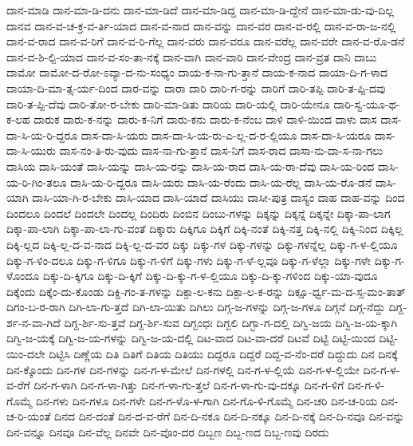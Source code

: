 {ದಾನ-ಮಾಡಿ
ದಾನ-ಮಾ-ಡಿ-ದನು
ದಾನ-ಮಾ-ಡಿದೆ
ದಾನ-ಮಾ-ಡಿದ್ದ
ದಾನ-ಮಾ-ಡಿ-ದ್ದೇನೆ
ದಾನ-ಮಾ-ಡು-ವು-ದಿಲ್ಲ
ದಾನವ
ದಾನ-ವ-ಚ-ಕ್ರ-ವ-ರ್ತಿ-ಯಾದ
ದಾನ-ವ-ನಾದ
ದಾನ-ವನ್ನು
ದಾನ-ವರ
ದಾನ-ವ-ರಲ್ಲಿ
ದಾನ-ವ-ರಾ-ಜ-ನಲ್ಲಿ
ದಾನ-ವ-ರಾದ
ದಾನ-ವ-ರಿಗೆ
ದಾನ-ವ-ರಿ-ಗೆಲ್ಲ
ದಾನ-ವರು
ದಾನ-ವರೂ
ದಾನ-ವರೆಲ್ಲ
ದಾನ-ವರೇ
ದಾನ-ವ-ರೊ-ಡನೆ
ದಾನ-ವ-ಶಿ-ಲ್ಪಿ-ಯಾದ
ದಾನ-ವ-ಸಂ-ತಾ-ನಕ್ಕೆ
ದಾನ-ವಾಗಿ
ದಾನ-ವಾರಿ
ದಾನ-ವೇಂದ್ರ
ದಾನ-ವ್ರತ
ದಾನಿ
ದಾಬು
ದಾಮೋ
ದಾಮೋ-ದ-ರೋ-ಽವ್ಯಾ-ದ-ನು-ಸಂಧ್ಯಂ
ದಾಯ-ಕ-ನಾ-ಗು-ತ್ತಾನೆ
ದಾಯ-ಕ-ನಾದ
ದಾಯಾ-ದಿ-ಗ-ಳಾದ
ದಾಯಾ-ದಿ-ಮಾ-ತ್ಸ-ರ್ಯ-ದಿಂದ
ದಾರ-ವನ್ನು
ದಾರಾ
ದಾರಿ
ದಾರಿ-ಗ-ರನ್ನು
ದಾರಿಗೆ
ದಾರಿ-ತಪ್ಪಿ
ದಾರಿ-ತ-ಪ್ಪಿ-ದವು
ದಾರಿ-ತ-ಪ್ಪಿ-ದೆವು
ದಾರಿ-ತೋ-ರ-ಬೇಕು
ದಾರಿ-ಮಾ-ಡಿತು
ದಾರಿಯ
ದಾರಿ-ಯಲ್ಲಿ
ದಾರಿ-ಯೇನೂ
ದಾರಿ-ಸ್ವ-ಯೂ-ಥ-ಕ-ಲಹ
ದಾರುಕ
ದಾರು-ಕ-ನನ್ನು
ದಾರು-ಕ-ನಿಗೆ
ದಾರು-ಕನು
ದಾರು-ಕ-ನೆಂಬ
ದಾಳಿ
ದಾಳಿ-ಯಿಂದ
ದಾಳು
ದಾಸ
ದಾಸ-ದಾ-ಸಿ-ಯ-ರಿ-ದ್ದರೂ
ದಾಸ-ದಾ-ಸಿ-ಯರು
ದಾಸ-ದಾ-ಸಿ-ಯ-ರು-ಎ-ಲ್ಲ-ದ-ರ-ಲ್ಲಿಯೂ
ದಾಸ-ದಾ-ಸಿ-ಯರೂ
ದಾಸ-ದಾ-ಸಿ-ಯುರು
ದಾಸ-ನಂ-ತಿ-ರು-ವುದು
ದಾಸ-ನಾ-ಗು-ತ್ತಾನೆ
ದಾಸ-ನಿಗೆ
ದಾಸ-ರಾದ
ದಾಸಾ-ನು-ದಾ-ಸ-ನಾ-ಗಲು
ದಾಸಿಯ
ದಾಸಿ-ಯಂತೆ
ದಾಸಿ-ಯನ್ನು
ದಾಸಿ-ಯ-ರನ್ನು
ದಾಸಿ-ಯ-ರಾದ
ದಾಸಿ-ಯ-ರಾ-ದೆವು
ದಾಸಿ-ಯ-ರಿಂದ
ದಾಸಿ-ಯ-ರಿ-ಗಿಂ-ತಲೂ
ದಾಸಿ-ಯ-ರಿ-ದ್ದರೂ
ದಾಸಿ-ಯರು
ದಾಸಿ-ಯ-ರೆಂದು
ದಾಸಿ-ಯ-ರೆಲ್ಲ
ದಾಸಿ-ಯ-ರೊ-ಡನೆ
ದಾಸಿ-ಯಾಗಿ
ದಾಸಿ-ಯಾ-ಗಿ-ರ-ಬೇಕು
ದಾಸಿ-ಯಾದ
ದಾಸಿ-ಯಾದೆ
ದಾಸಿಯು
ದಾಸೀ-ಪುತ್ರ
ದಾಸ್ಯಂ
ದಾಹ
ದಾಹ-ವನ್ನು
ದಿಂದ
ದಿಂದಲೂ
ದಿಂದಲೆ
ದಿಂದಲೇ
ದಿಂದಲ್ಲ
ದಿಂದಿರು
ದಿಂಬಿನ
ದಿಂಬು-ಗಳನ್ನು
ದಿಕ್ಕನ್ನು
ದಿಕ್ಕನ್ನೆ
ದಿಕ್ಕನ್ನೇ
ದಿಕ್ಕಾ-ಪಾ-ಲಾಗ
ದಿಕ್ಕಾ-ಪಾ-ಲಾಗಿ
ದಿಕ್ಕಾ-ಪಾ-ಲಾ-ಗು-ವಂತೆ
ದಿಕ್ಕಾರು
ದಿಕ್ಕಿಗೂ
ದಿಕ್ಕಿಗೆ
ದಿಕ್ಕಿ-ನಂತೆ
ದಿಕ್ಕಿ-ನತ್ತ
ದಿಕ್ಕಿ-ನಲ್ಲಿ
ದಿಕ್ಕಿ-ನಿಂದ
ದಿಕ್ಕಿಲ್ಲ
ದಿಕ್ಕಿ-ಲ್ಲದ
ದಿಕ್ಕಿ-ಲ್ಲ-ದ-ವ-ನಾದ
ದಿಕ್ಕಿ-ಲ್ಲ-ದ-ವರ
ದಿಕ್ಕು
ದಿಕ್ಕು-ಗಳ
ದಿಕ್ಕು-ಗಳನ್ನು
ದಿಕ್ಕು-ಗಳನ್ನೆಲ್ಲ
ದಿಕ್ಕು-ಗ-ಳ-ಲ್ಲಿಯೂ
ದಿಕ್ಕು-ಗ-ಳಿಂ-ದಲೂ
ದಿಕ್ಕು-ಗ-ಳಿಗೂ
ದಿಕ್ಕು-ಗ-ಳಿಗೆ
ದಿಕ್ಕು-ಗಳು
ದಿಕ್ಕು-ಗ-ಳೆ-ಲ್ಲವೂ
ದಿಕ್ಕು-ಗ-ಳೆಲ್ಲಾ
ದಿಕ್ಕು-ಗಳೇ
ದಿಕ್ಕು-ಗ-ಳೊಂದೂ
ದಿಕ್ಕು-ದಿ-ಕ್ಕಿಗೂ
ದಿಕ್ಕು-ದಿ-ಕ್ಕಿಗೆ
ದಿಕ್ಕು-ದಿ-ಕ್ಕು-ಗ-ಳ-ಲ್ಲಿಯೂ
ದಿಕ್ಕು-ದಿ-ಕ್ಕು-ಗಳಿಂದ
ದಿಕ್ಕು-ಯಾ-ವುದೂ
ದಿಕ್ಕೆಂದು
ದಿಕ್ಕೆಂ-ದು-ಕೊಂಡು
ದಿಕ್ದಿ-ಗಂ-ತ-ಗಳನ್ನು
ದಿಕ್ಪಾ-ಲ-ಕನು
ದಿಕ್ಪಾ-ಲ-ಕ-ರನ್ನು
ದಿಕ್ಷೂ-ರ್ಧ್ವ-ಮ-ದ-ಸ್ಸ-ಮಂ-ತಾತ್
ದಿಗಂ-ಬ-ರ-ರಾಗಿ
ದಿಗಿ-ಲಾ-ಗು-ತ್ತದೆ
ದಿಗಿ-ಲಾ-ಯಿತು
ದಿಗಿಲು
ದಿಗ್ಗ-ಜ-ಗಳನ್ನು
ದಿಗ್ಗ-ಜ-ಗಳೂ
ದಿಗ್ಗನೆ
ದಿಗ್ಗ-ನೆದ್ದು
ದಿಗ್ದ-ರ್ಶ-ನ-ವಾ-ಗಿದೆ
ದಿಗ್ದ-ರ್ಶಿ-ಸು-ತ್ತವೆ
ದಿಗ್ದ-ರ್ಶಿ-ಸುವ
ದಿಗ್ಬಂಧಃ
ದಿಗ್ಬಲಿ
ದಿಗ್ಭಾ-ಗ-ದಲ್ಲಿ
ದಿಗ್ವಿ-ಜಯ
ದಿಗ್ವಿ-ಜ-ಯ-ಕ್ಕಾಗಿ
ದಿಗ್ವಿ-ಜ-ಯಕ್ಕೆ
ದಿಗ್ವಿ-ಜ-ಯ-ಗಳನ್ನು
ದಿಗ್ವಿ-ಜ-ಯ-ದಲ್ಲಿ
ದಿಟ-ವಾದ
ದಿಟ-ವಾ-ದರೆ
ದಿಟವೆ
ದಿಟ್ಟಿ
ದಿಟ್ಟಿ-ಯಿಂದ
ದಿಟ್ಟಿ-ಯಿಂ-ದಲೇ
ದಿಟ್ಟಿಸಿ
ದಿಣ್ಣೆಯ
ದಿತಿ
ದಿತಿಗೆ
ದಿತಿಯ
ದಿತಿಯು
ದಿದ್ದರೂ
ದಿದ್ದರೆ
ದಿದ್ದ-ವ-ನೆಂ-ದರೆ
ದಿದ್ದುದು
ದಿನ
ದಿನಕ್ಕೆ
ದಿನ-ಕ್ಕೊಂದು
ದಿನ-ಗಳ
ದಿನ-ಗಳನ್ನು
ದಿನ-ಗ-ಳ-ಮೇಲೆ
ದಿನ-ಗಳಲ್ಲಿ
ದಿನ-ಗ-ಳ-ಲ್ಲಿಯೆ
ದಿನ-ಗ-ಳ-ಲ್ಲಿಯೇ
ದಿನ-ಗ-ಳ-ವ-ರೆಗೆ
ದಿನ-ಗ-ಳಾಗಿ
ದಿನ-ಗ-ಳಾ-ಗಿತ್ತು
ದಿನ-ಗ-ಳಾ-ಗು-ತ್ತಲೆ
ದಿನ-ಗ-ಳಾ-ಗು-ವು-ದಕ್ಕೂ
ದಿನ-ಗ-ಳಿಗೆ
ದಿನ-ಗ-ಳಿ-ಗೊಮ್ಮೆ
ದಿನ-ಗಳು
ದಿನ-ಗಳೂ
ದಿನ-ಗಳೇ
ದಿನ-ಗ-ಳೊ-ಳ-ಗಾಗಿ
ದಿನ-ಗೊ-ಳಿ-ಗೊಮ್ಮೆ
ದಿನ-ಚರಿ
ದಿನ-ಚ-ರಿಯ
ದಿನ-ಚ-ರಿ-ಯಂತೆ
ದಿನದ
ದಿನ-ದಂತೆ
ದಿನ-ದ-ವ-ರೆಗೆ
ದಿನ-ದಿ-ನಕೂ
ದಿನ-ದಿ-ನಕ್ಕೂ
ದಿನ-ದಿ-ನಕ್ಕೆ
ದಿನ-ದಿ-ನವೂ
ದಿನ-ವನ್ನು
ದಿನ-ವನ್ನೂ
ದಿನವೂ
ದಿನ-ವೆಲ್ಲ
ದಿನವೇ
ದಿನ-ವೊಂ-ದರ
ದಿಬ್ಬಣ
ದಿಬ್ಬ-ಣದ
ದಿಬ್ಬ-ಣವು
ದಿರದು
}
